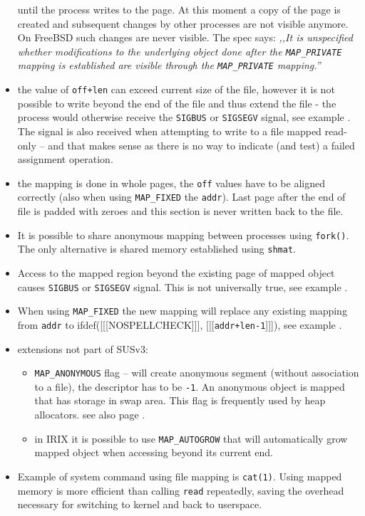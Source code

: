 \begin{itemize}
until the process writes to the page. At this moment a copy of the page is
created and subsequent changes by other processes are not visible anymore.
On FreeBSD such changes are never visible.  The spec says:
\emph{,,It is unspecified whether modifications to the underlying object done
after the \texttt{MAP\_PRIVATE} mapping is established are visible through the
\texttt{MAP\_PRIVATE} mapping.''}
\item the value of \texttt{off+l{}en} can exceed current size of the file,
however it is not possible to write beyond the end of the file and thus
extend the file - the process would otherwise receive the \texttt{SIGBUS} or
\texttt{SIGSEGV} signal, see example .
The signal is also received when attempting to write to a file mapped read-only
-- and that makes sense as there is no way to indicate (and test) a failed
assignment operation.
\item the mapping is done in whole pages, the \texttt{off} values have to
be aligned correctly (also when using \texttt{MAP\_FIXED} the \texttt{addr}).
Last page after the end of file is padded with zeroes and this section is
never written back to the file.
\item It is possible to share anonymous mapping between processes using
\texttt{fork()}. The only alternative is shared memory established using
\texttt{shmat}.
\item Access to the mapped region beyond the existing page of mapped object
causes \texttt{SIGBUS} or \texttt{SIGSEGV} signal.
This is not universally true, see example .
\item When using \texttt{MAP\_FIXED} the new mapping will replace any existing
mapping from \texttt{addr} to
ifdef([[[NOSPELLCHECK]]], [[[\texttt{addr+l{}en-1}]]]), see example
.
\item extensions not part of SUSv3:
    \begin{itemize}
    \setlength{\itemsep}{0.8\itemsep}
    \item \texttt{MAP\_ANONYMOUS} flag -- will create anonymous segment
    (without association to a file), the descriptor has to be \texttt{-1}.
    An anonymous object is mapped that has storage in swap area.
    This flag is frequently used by heap allocators.
    see also page \pageref{SOLARIS_PROC_ADDR_SPACE}.
    \item in IRIX it is possible to use \texttt{MAP\_AUTOGROW} that will
    automatically grow mapped object when accessing beyond its current end.
    \end{itemize}
\item Example of system command using file mapping is \texttt{cat(1)}. 
Using mapped memory is more efficient than calling \texttt{read} repeatedly,
saving the overhead necessary for switching to kernel and back to userspace.
\end{itemize}

